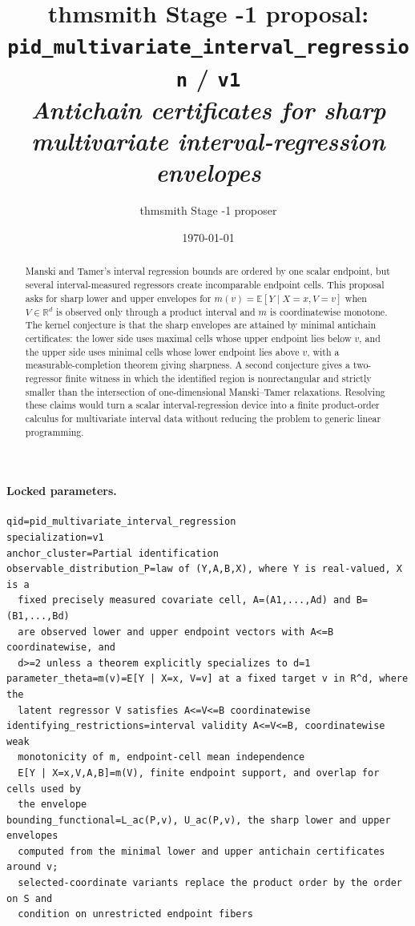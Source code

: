 \documentclass[11pt]{article}
\title{thmsmith Stage -1 proposal: \texttt{pid\_multivariate\_interval\_regression} / \texttt{v1}%
  \\ \large\textit{Antichain certificates for sharp multivariate interval-regression envelopes}}
\author{thmsmith Stage -1 proposer}
\date{\today}
\newcommand{\E}{\mathbb{E}}
\newcommand{\R}{\mathbb{R}}
\theoremstyle{definition}
\theoremstyle{plain}
\theoremstyle{remark}
\begin{document}
\maketitle


\paragraph{Locked parameters.}
\begin{verbatim}
qid=pid_multivariate_interval_regression
specialization=v1
anchor_cluster=Partial identification
observable_distribution_P=law of (Y,A,B,X), where Y is real-valued, X is a
  fixed precisely measured covariate cell, A=(A1,...,Ad) and B=(B1,...,Bd)
  are observed lower and upper endpoint vectors with A<=B coordinatewise, and
  d>=2 unless a theorem explicitly specializes to d=1
parameter_theta=m(v)=E[Y | X=x, V=v] at a fixed target v in R^d, where the
  latent regressor V satisfies A<=V<=B coordinatewise
identifying_restrictions=interval validity A<=V<=B, coordinatewise weak
  monotonicity of m, endpoint-cell mean independence
  E[Y | X=x,V,A,B]=m(V), finite endpoint support, and overlap for cells used by
  the envelope
bounding_functional=L_ac(P,v), U_ac(P,v), the sharp lower and upper envelopes
  computed from the minimal lower and upper antichain certificates around v;
  selected-coordinate variants replace the product order by the order on S and
  condition on unrestricted endpoint fibers
\end{verbatim}

\begin{abstract}
Manski and Tamer's interval regression bounds are ordered by one scalar endpoint, but several interval-measured regressors create incomparable endpoint cells.  This proposal asks for sharp lower and upper envelopes for \(m(v)=\E[Y\mid X=x,V=v]\) when \(V\in\R^d\) is observed only through a product interval and \(m\) is coordinatewise monotone.  The kernel conjecture is that the sharp envelopes are attained by minimal antichain certificates: the lower side uses maximal cells whose upper endpoint lies below \(v\), and the upper side uses minimal cells whose lower endpoint lies above \(v\), with a measurable-completion theorem giving sharpness.  A second conjecture gives a two-regressor finite witness in which the identified region is nonrectangular and strictly smaller than the intersection of one-dimensional Manski--Tamer relaxations.  Resolving these claims would turn a scalar interval-regression device into a finite product-order calculus for multivariate interval data without reducing the problem to generic linear programming.
\end{abstract}
\end{document}
